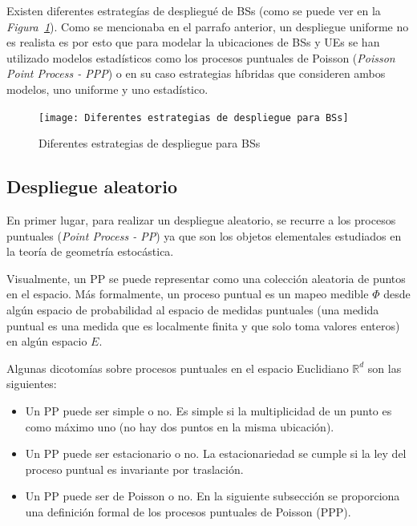 Existen diferentes estrategías de despliegué de BSs (como se puede ver en la \textit{Figura~\ref{fig:BSs}}). Como se mencionaba en el parrafo anterior, un despliegue uniforme no es realista es por esto que para modelar la ubicaciones de BSs y UEs se han utilizado modelos estadísticos como los procesos puntuales de Poisson (\textit{Poisson Point Process - PPP}) o en su caso estrategias híbridas que consideren ambos modelos, uno uniforme y uno estadístico.

\begin{figure}[th]
\centering
\texttt{[image: Diferentes estrategias de despliegue para BSs]}
\decoRule
\caption[Diferentes estrategias de despliegue para BSs]{Diferentes estrategias de despliegue para BSs}
\label{fig:BSs}
\end{figure}

\subsection{Despliegue aleatorio}\label{PPP_C2}

En primer lugar, para realizar un despliegue aleatorio, se recurre a los procesos puntuales (\textit{Point Process - PP}) \parencite{Haenggi2009} ya que son los objetos elementales estudiados en la teoría de geometría estocástica.\newline

Visualmente, un PP se puede representar como una colección aleatoria de puntos en el espacio. Más formalmente, un proceso puntual es un mapeo medible $\Phi$ desde algún espacio de probabilidad al espacio de medidas puntuales (una medida puntual es una medida que es localmente finita y que solo toma valores enteros) en algún espacio $E$.\newline

Algunas dicotomías sobre procesos puntuales en el espacio Euclidiano $\mathbb{R}^{d}$ son las siguientes:

\begin{itemize}
    \item Un PP puede ser simple o no. Es simple si la multiplicidad de un punto es como máximo uno (no hay dos puntos en la misma ubicación).
    \item Un PP puede ser estacionario o no. La estacionariedad se cumple si la ley del proceso puntual es invariante por traslación.
    \item Un PP puede ser de Poisson o no. En la siguiente subsección se proporciona una definición formal de los procesos puntuales de Poisson (PPP).
\end{itemize}

